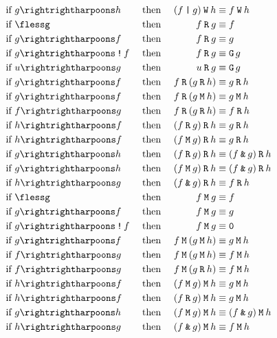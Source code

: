 \documentclass[a4paper,twoside,10pt,DIV=12]{scrreprt}
\DeclareMathOperator{\G}{\texttt{G}}
\newcommand{\R}{\mathbin{\texttt{R}}}
\newcommand{\M}{\mathbin{\texttt{M}}}
\newcommand{\W}{\mathbin{\texttt{W}}}
\DeclareMathOperator{\NOT}{\texttt{!}}
\newcommand{\OR}{\mathbin{\texttt{|}}}
\newcommand{\AND}{\mathbin{\texttt{\&}}}
\newcommand{\0}{\texttt{0}}
\newcommand{\1}{\texttt{1}}
\def\simp{\rightrightharpoons}
\begin{document}
\begin{alignat*}{3}
\text{if~} & g\simp h        &  & \text{~then~} & (f\OR g) \W h       & \equiv f \W h             \\
\text{if~} & \flessg         &  & \text{~then~} & f\R g               & \equiv f                  \\
\text{if~} & g\simp f        &  & \text{~then~} & f\R g               & \equiv g                  \\
\text{if~} & g\simp \NOT f   &  & \text{~then~} & f\R g               & \equiv \G g               \\
\text{if~} & u\simp g        &  & \text{~then~} & u\R g               & \equiv \G g               \\
\text{if~} & g\simp f        &  & \text{~then~} & f\R (g \R h)        & \equiv g \R h             \\
\text{if~} & g\simp f        &  & \text{~then~} & f\R (g \M h)        & \equiv g \M h             \\
\text{if~} & f\simp g        &  & \text{~then~} & f\R (g \R h)        & \equiv f \R h             \\
\text{if~} & h\simp f        &  & \text{~then~} & (f\R g) \R h        & \equiv g \R h             \\
\text{if~} & h\simp f        &  & \text{~then~} & (f\M g) \R h        & \equiv g \R h             \\
\text{if~} & g\simp h        &  & \text{~then~} & (f\R g) \R h        & \equiv (f \AND g) \R h    \\
\text{if~} & g\simp h        &  & \text{~then~} & (f\M g) \R h        & \equiv (f \AND g) \R h    \\
\text{if~} & h\simp g        &  & \text{~then~} & (f\AND g) \R h      & \equiv f \R h             \\
\text{if~} & \flessg         &  & \text{~then~} & f\M g               & \equiv f                  \\
\text{if~} & g\simp f        &  & \text{~then~} & f\M g               & \equiv g                  \\
\text{if~} & g\simp \NOT f   &  & \text{~then~} & f\M g               & \equiv \0                 \\
\text{if~} & g\simp f        &  & \text{~then~} & f\M (g \M h)        & \equiv g \M h             \\
\text{if~} & f\simp g        &  & \text{~then~} & f\M (g \M h)        & \equiv f \M h             \\
\text{if~} & f\simp g        &  & \text{~then~} & f\M (g \R h)        & \equiv f \M h             \\
\text{if~} & h\simp f        &  & \text{~then~} & (f\M g) \M h        & \equiv g \M h             \\
\text{if~} & h\simp f        &  & \text{~then~} & (f\R g) \M h        & \equiv g \M h             \\
\text{if~} & g\simp h        &  & \text{~then~} & (f\M g) \M h        & \equiv (f \AND g) \M h    \\
\text{if~} & h\simp g        &  & \text{~then~} & (f\AND g) \M h      & \equiv f \M h             \\
\end{alignat*}
\endgroup
\end{document}
